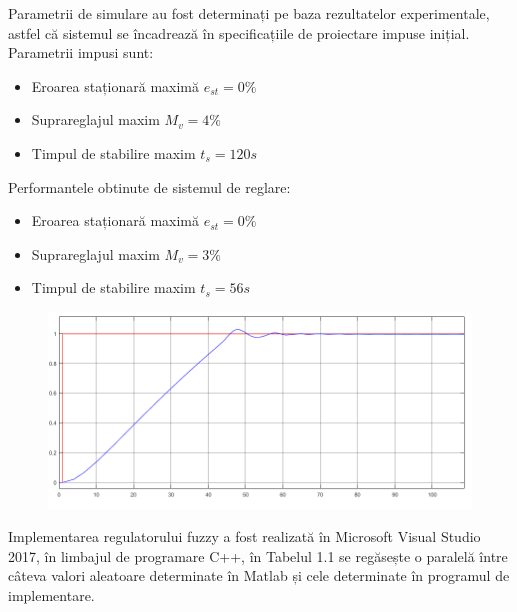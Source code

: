 \documentclass[11pt]{article}
\begin{document}
Parametrii de simulare au fost determinați pe baza rezultatelor experimentale, astfel că sistemul se încadrează în specificațiile de proiectare impuse inițial.
Parametrii impusi sunt:
\begin{itemize}
	\item Eroarea staționară maximă $e_{st} = 0\%$
	\item Suprareglajul maxim $M_v = 4\%$
	\item Timpul de stabilire maxim $t_s = 120s$
\end{itemize}
Performantele obtinute de sistemul de reglare:
\begin{itemize}
	\item Eroarea staționară maximă $e_{st} = 0\%$
	\item Suprareglajul maxim $M_v = 3\%$
	\item Timpul de stabilire maxim $t_s = 56s$
\end{itemize}
\begin{figure}[H]
	\centering
	\includegraphics[width=1\linewidth]{diagrama.PNG}
	\label{fig:test2}
\end{figure}
Implementarea regulatorului fuzzy a fost realizată în Microsoft Visual Studio 2017, în limbajul de programare C++, în Tabelul 1.1 se regăsește o paralelă între câteva valori aleatoare determinate în Matlab și cele determinate în programul de implementare.
\newpage

\nocite{*}


\end{document}
